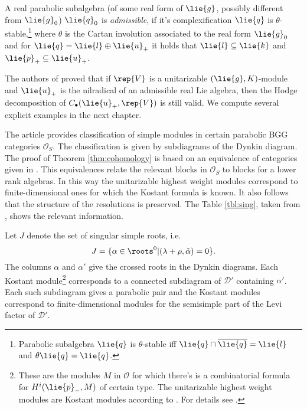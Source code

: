 
\begin{definition}
A real parabolic subalgebra (of some real form of $\lie{g}$, possibly different from $\lie{g}_0$) $\lie{q}_0$ is  \emph{admissible}, if it's complexification $\lie{q}$ is  $\theta$-stable,\footnote{Parabolic subalgebra $\lie{q}$ is $\theta$-stable iff $\lie{q}\cap\overline{\lie{q}}=\lie{l}$ and $\theta \lie{q}=\lie{q}$.} where $\theta$ is the Cartan involution associated to the real form $\lie{g}_0$ and for $\lie{q}=\lie{l}\oplus\lie{u}_+$ it holds that $\lie{l}\subseteq \lie{k}$ and $\lie{p}_+\subseteq\lie{u}_+$.
\end{definition}

The authors of \cite{huang_dirac_2006} proved that if $\rep{V}$ is a unitarizable $(\lie{g},K)$-module and $\lie{u}_+$ is the nilradical of an admissible real Lie algebra, then the Hodge decomposition of $C_\bullet(\lie{u}_+,\rep{V})$ is still valid. We compute several explicit examples in the next chapter. %

The article \cite{boe_kostant_2009} provides classification of simple modules in certain parabolic BGG categories $\mathcal{O}_S$. The classification is given by subdiagrams of the Dynkin diagram. The proof of Theorem \ref{thm:cohomology} is based on an equivalence of categories given in \cite{enright_categories_1987}. This equivalences relate the relevant blocks in $\mathcal{O}_S$ to blocks for a lower rank algebras. In this way the unitarizable highest weight modules correspond to finite-dimensional ones for which the Kostant formula is known. It also follows that the structure of the resolutions is preserved. The Table \ref{tbl:sing}, taken from \cite{boe_kostant_2009}, shows the relevant information. 

Let $J$ denote the set of singular simple roots, i.e. \[J= \{ \alpha \in \roots^0 | (\lambda+\rho,\check{\alpha}) = 0 \}.\] The columns $\alpha$ and $\alpha'$ give the crossed roots in the Dynkin diagrams. Each Kostant module\footnote{These are the modules $M$ in $\mathcal{O}$ for which there's is a combinatorial formula for $H^i(\lie{p}_-,M)$ of certain type. The unitarizable highest weight modules are Kostant modules according to \cite{davidson_differential_1991}. For details see \cite{boe_kostant_2009}.} corresponds to a connected subdiagram of $\mathcal{D}'$ containing $\alpha'$. Each such subdiagram gives a parabolic pair and the Kostant modules correspond to finite-dimensional modules for the semisimple part of the Levi factor of $\mathcal{D}'$.

